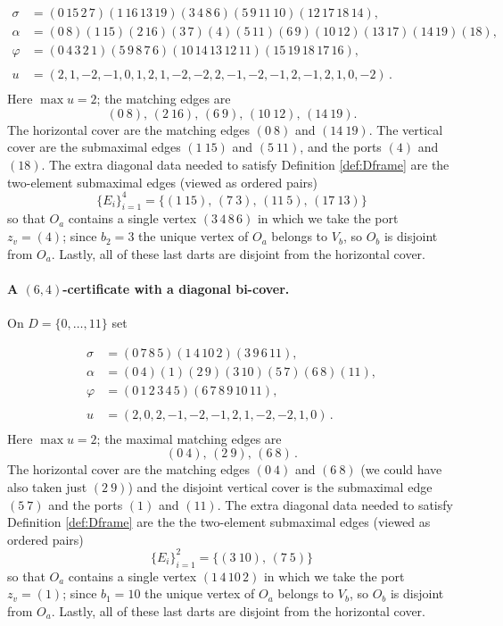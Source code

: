 \documentclass[11pt]{article}
\theoremstyle{remark}
\begin{document}
\begin{equation}
\begin{aligned}
\sigma&=(0\,15\,2\,7)(1\,16\,13\,19)(3\,4\,8\,6)(5\,9\,11\,10)(12\,17\,18\,14),\\[2pt]
\alpha&=(0\,8)(1\,15)(2\,16)(3\,7)(4)(5\,11)(6\,9)(10\,12)(13\,17)(14\,19)(18),\\[2pt]
\varphi&=(0\,4\,3\,2\,1)(5\,9\,8\,7\,6)(10\,14\,13\,12\,11)(15\,19\,18\,17\,16),\\ \\[2pt]
u&=(2,1,-2,-1,0,1,2,1,-2,-2,2,-1, -2,-1,2,-1,2,1,0,-2)\, . \\
\end{aligned}
\label{eq:C54}
\end{equation}
Here $\max u=2$; the matching edges are
\[(0\ 8),\, (2\ 16), \,(6\ 9) ,\, (10\ 12) ,\, (14\ 19) .\]
The horizontal cover are the matching edges $(0\ 8)$ and $(14\ 19)$. The vertical cover are the submaximal edges $(1\ 15)$ and $(5\ 11)$, and the ports $(4)$ and $(18)$. The extra diagonal data needed to satisfy Definition \ref{def:Dframe} are the two-element submaximal  edges (viewed as ordered pairs)
$$\{E_i\}_{i=1}^4 = \big \{ (1\ 15),\, (7\ 3),\, (11\ 5),\, (17\ 13) \big \}$$
so that $O_a$ contains a single vertex $(3\,4\,8\,6)$ in which we take the port $z_v=(4)$; since $b_2=3$ the unique vertex of $O_a$ belongs to $V_b$, so $O_b$ is disjoint from $O_a$. Lastly, all of these last darts are disjoint from the horizontal cover.


\paragraph{A $(6,4)$-certificate with a diagonal bi-cover.}
On $D=\{0,\dots,11\}$ set

\begin{equation}
\begin{aligned}
\sigma&=(0\,7\,8\,5)(1\,4\,10\,2)(3\,9\,6\,11),\\[2pt]
\alpha&=(0\,4)(1)(2\,9)(3\,10)(5\,7)(6\,8)(11),\\[2pt]
\varphi&=(0\,1\,2\,3\,4\,5)(6\,7\,8\,9\,10\,11),\\[2pt] \\
u&=(2,0,2,-1,-2,-1,2,1,-2,-2,1,0)\, . \\
\end{aligned}
\label{eq:C64}
\end{equation}
Here $\max u=2$; the maximal matching edges are 
\[(0\ 4), \,(2\ 9), \, (6\ 8) \, .\]
The horizontal cover are the matching edges $(0\ 4)$ and $(6\ 8)$ (we could have also taken just $(2\ 9)$) and the disjoint vertical cover is the submaximal edge $(5\ 7)$ and the ports $(1)$ and $(11)$. The extra diagonal data needed to satisfy Definition \ref{def:Dframe} are the 
the two-element submaximal edges (viewed as ordered pairs)
$$\{E_i\}_{i=1}^2 = \big \{ (3\ 10),\, (7\ 5) \big \}$$
so that $O_a$ contains a single vertex $(1\,4\,10\, 2)$ in which we take the port $z_v=(1)$; since $b_1=10$ the unique vertex of $O_a$ belongs to $V_b$, so $O_b$ is disjoint from $O_a$. Lastly, all of these last darts are disjoint from the horizontal cover. 
\end{document}
